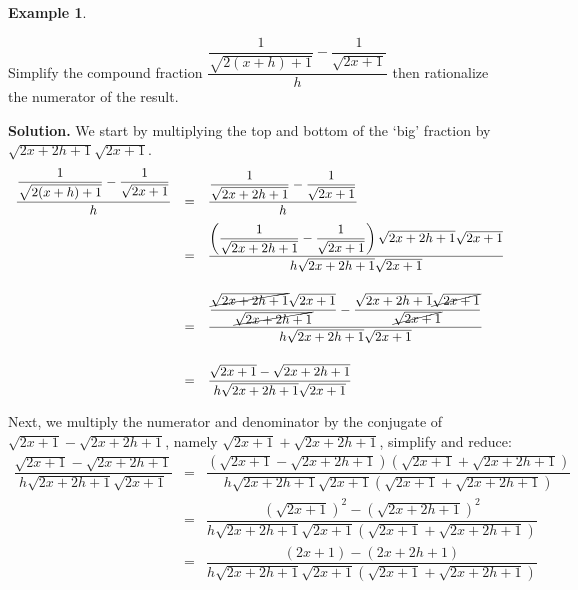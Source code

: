 \documentclass[11pt]{article}
\theoremstyle{definition}  %
\newtheorem{ex}{\bf Example}
\begin{document}
\begin{ex} \label{rationalizenumdenombosslevel}

Simplify the compound fraction $\dfrac{\dfrac{1}{\sqrt{2(x+h)+1}} - \dfrac{1}{\sqrt{2x+1}}}{h}$ then rationalize the numerator of the result.

\medskip

{\bf Solution.} We start by multiplying the top and bottom of the `big' fraction by $\sqrt{2x+2h+1} \sqrt{2x+1}$.  \[ \begin{array}{rcl}

\dfrac{\dfrac{1}{\sqrt{2(x+h)+1}} - \dfrac{1}{\sqrt{2x+1}}}{h} & = & \dfrac{\dfrac{1}{\sqrt{2x+2h+1}} - \dfrac{1}{\sqrt{2x+1}}}{h}\\[10pt]

                                                               & = & \dfrac{\left(\dfrac{1}{\sqrt{2x+2h+1}} - \dfrac{1}{\sqrt{2x+1}}\right) \sqrt{2x+2h+1} \sqrt{2x+1}}{h\sqrt{2x+2h+1} \sqrt{2x+1}}\\[22pt]
																															
																															& = & \dfrac{\dfrac{\cancel{\sqrt{2x+2h+1}}\sqrt{2x+1}}{\cancel{\sqrt{2x+2h+1}}} - \dfrac{\sqrt{2x+2h+1} \cancel{\sqrt{2x+1}}}{\cancel{\sqrt{2x+1}}}}{h\sqrt{2x+2h+1} \sqrt{2x+1}}\\[22pt]
																																			
																															& = & \dfrac{\sqrt{2x + 1}- \sqrt{2x+2h+1}}{h\sqrt{2x+2h+1} \sqrt{2x+1}}\\	
																															\end{array}\]
																															
Next, we multiply the numerator and denominator by the conjugate of $\sqrt{2x+1} - \sqrt{2x+2h+1}$, namely $\sqrt{2x+1} + \sqrt{2x+2h+1}$, simplify and reduce:\[\begin{array}{rcl}

 \dfrac{\sqrt{2x + 1}- \sqrt{2x+2h+1}}{h\sqrt{2x+2h+1} \sqrt{2x+1}} & = & \dfrac{(\sqrt{2x+1} - \sqrt{2x+2h+1})(\sqrt{2x+1} + \sqrt{2x+2h+1})}{h\sqrt{2x+2h+1} \sqrt{2x+1}(\sqrt{2x+1} + \sqrt{2x+2h+1})} \\ [20pt]

 & = & \dfrac{(\sqrt{2x+1})^2 - (\sqrt{2x+2h+1})^2}{h\sqrt{2x+2h+1} \sqrt{2x+1}(\sqrt{2x+1} + \sqrt{2x+2h+1})} \\[20pt]

 & = & \dfrac{(2x+1) - (2x+2h+1)}{h\sqrt{2x+2h+1} \sqrt{2x+1}(\sqrt{2x+1} + \sqrt{2x+2h+1})} \\[20pt]


\end{array}\]
\end{ex}
\end{document}

